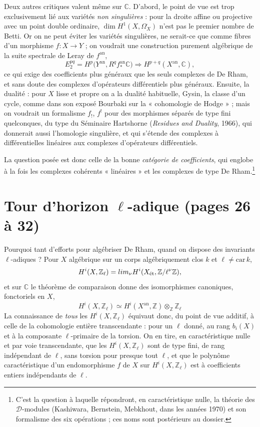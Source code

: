 \documentclass[11pt,a4paper]{article}
\begin{document}
Deux autres critiques valent même sur $\mathbb{C}$. D'abord, le point de vue
est trop exclusivement lié aux variétés \emph{non singulières} : pour la
droite affine ou projective avec un point double ordinaire, $\dim
H^{1}(X, \Omega^{\cdot}_X)$ n'est pas le premier nombre de Betti. Or on ne
peut éviter les variétés singulières, ne serait-ce que comme fibres d'un
morphisme $f : X \to Y$ ; on voudrait une construction purement algébrique
de la suite spectrale de Leray de $f^{\mathrm{an}}$,
\[
  E_{2}^{pq} = H^{p}\bigl(Y^{\mathrm{an}}, R^{q}f^{\mathrm{an}}_{*}
  \mathbb{C}\bigr) \Longrightarrow H^{p+q}(X^{\mathrm{an}}, \mathbb{C}) ,
\]
ce qui exige des coefficients plus généraux que les seuls complexes de De
Rham, et sans doute des complexes d'opérateurs différentiels plus généraux.
Ensuite, la dualité : pour $X$ lisse et propre on a la dualité habituelle,
Gysin, la classe d'un cycle, comme dans son exposé Bourbaki sur la
« cohomologie de Hodge » ; mais on voudrait un formalisme $f_{!}$, $f^{!}$
pour des morphismes séparés de type fini quelconques, du type du Séminaire
Hartshorne (\emph{Residues and Duality}, 1966), qui donnerait aussi
l'homologie singulière, et qui s'étende des complexes à différentielles
linéaires aux complexes d'opérateurs différentiels.

La question posée est donc celle de la bonne \emph{catégorie de
coefficients}, qui englobe à la fois les complexes cohérents
« linéaires » et les complexes de type De Rham.\footnote{C'est la question à
laquelle répondront, en caractéristique nulle, la théorie des
$\mathcal{D}$-modules (Kashiwara, Bernstein, Mebkhout, dans les années 1970)
et son formalisme des six opérations ; ces noms sont postérieurs au dossier.}

\section*{Tour d'horizon $\ell$-adique (pages 26 à 32)}

Pourquoi tant d'efforts pour algébriser De Rham, quand on dispose des
invariants $\ell$-adiques ? Pour $X$ algébrique sur un corps algébriquement
clos $k$ et $\ell \neq \mathrm{car}\,k$,
\[
  H^{i}(X, \mathbb{Z}_\ell) = \varprojlim_{\nu}
  H^{i}(X_{\mathrm{\acute{e}t}}, \mathbb{Z}/\ell^{\nu}\mathbb{Z}) ,
\]
et sur $\mathbb{C}$ le théorème de comparaison donne des isomorphismes
canoniques, fonctoriels en $X$,
\[
  \boxed{\;H^{i}(X, \mathbb{Z}_\ell) \simeq
  H^{i}(X^{\mathrm{an}}, \mathbb{Z}) \otimes_{\mathbb{Z}} \mathbb{Z}_\ell\;}
\]
La connaissance de \emph{tous} les $H^{i}(X, \mathbb{Z}_\ell)$ équivaut donc,
du point de vue additif, à celle de la cohomologie entière transcendante :
pour un $\ell$ donné, au rang $b_i(X)$ et à la composante $\ell$-primaire de
la torsion. On en tire, en caractéristique nulle et par voie transcendante,
que les $H^{i}(X, \mathbb{Z}_\ell)$ sont de type fini, de rang indépendant de
$\ell$, sans torsion pour presque tout $\ell$, et que le polynôme
caractéristique d'un endomorphisme $f$ de $X$ sur $H^{i}(X, \mathbb{Z}_\ell)$
est à coefficients entiers indépendants de $\ell$.
\end{document}
